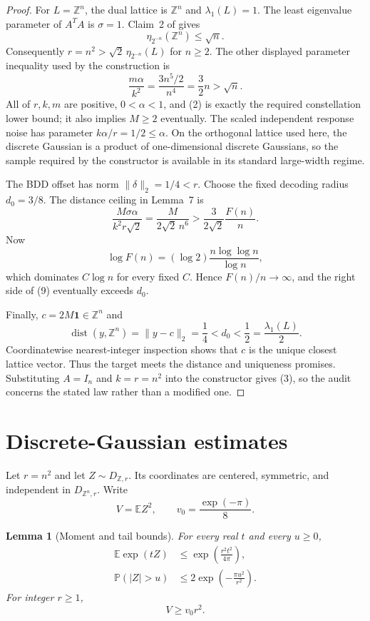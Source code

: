 \documentclass[11pt]{article}
\newtheorem{lemma}[theorem]{Lemma}
\theoremstyle{remark}
\newcommand{\Z}{\mathbb Z}
\newcommand{\one}{\mathbf 1}
\newcommand{\E}{\mathbb E}
\newcommand{\Prob}{\mathbb P}
\DeclareMathOperator{\dist}{dist}
\begin{document}
\begin{proof}
For \(L=\Z^n\), the dual lattice is \(\Z^n\) and
\(\lambda_1(L)=1\).  The least eigenvalue parameter of \(A^TA\) is
\(\sigma=1\).  Claim~2 of \cite{DeanGoldsmith2017} gives
\[
 \eta_{2^{-n}}(\Z^n)\le\sqrt n.
\]
Consequently \(r=n^2>\sqrt2\,\eta_{2^{-n}}(L)\) for \(n\ge2\).
The other displayed parameter inequality used by the construction is
\[
 \frac{m\alpha}{k^2}
 =\frac{3n^5/2}{n^4}
 =\frac32n>\sqrt n.
 \tag{8}
\]
All of \(r,k,m\) are positive, \(0<\alpha<1\), and (2) is exactly
the required constellation lower bound; it also implies \(M\ge2\)
eventually.  The scaled independent response noise has parameter
\(k\alpha/r=1/2\le\alpha\).  On the orthogonal lattice used here,
the discrete Gaussian is a product of one-dimensional discrete
Gaussians, so the sample required by the constructor is available in
its standard large-width regime.

The BDD offset has norm \(\lVert\delta\rVert_2=1/4<r\).  Choose the
fixed decoding radius \(d_0=3/8\).  The distance ceiling in Lemma~7 is
\[
 \frac{M\sigma\alpha}{k^2r\sqrt2}
 =\frac{M}{2\sqrt2\,n^6}
 >\frac{3}{2\sqrt2}\frac{F(n)}{n}.
 \tag{9}
\]
Now
\[
 \log F(n)=(\log2)\frac{n\log\log n}{\log n},
\]
which dominates \(C\log n\) for every fixed \(C\).  Hence
\(F(n)/n\to\infty\), and the right side of (9) eventually exceeds
\(d_0\).

Finally, \(c=2M\one\in\Z^n\) and
\[
 \dist(y,\Z^n)=\lVert y-c\rVert_2=\frac14<d_0<\frac12
 =\frac{\lambda_1(L)}2.
\]
Coordinatewise nearest-integer inspection shows that \(c\) is the unique
closest lattice vector.  Thus the target meets the distance and
uniqueness promises.  Substituting \(A=I_n\) and \(k=r=n^2\) into
the constructor gives (3), so the audit concerns the stated law rather
than a modified one.
\end{proof}

\section{Discrete-Gaussian estimates}

Let \(r=n^2\) and let \(Z\sim D_{\Z,r}\).  Its coordinates are
centered, symmetric, and independent in \(D_{\Z^n,r}\).  Write
\[
 V=\E Z^2,\qquad v_0=\frac{\exp(-\pi)}8.
\]

\begin{lemma}[Moment and tail bounds]\label{lem:dg}
For every real \(t\) and every \(u\ge0\),
\begin{align}
 \E\exp(tZ)&\le
   \exp\!\left(\frac{r^2t^2}{4\pi}\right),
 \tag{10}\\
 \Prob(|Z|>u)&\le
   2\exp\!\left(-\frac{\pi u^2}{r^2}\right).
 \tag{11}
\end{align}
For integer \(r\ge1\),
\[
 V\ge v_0r^2.
 \tag{12}
\]
\end{lemma}
\end{document}
